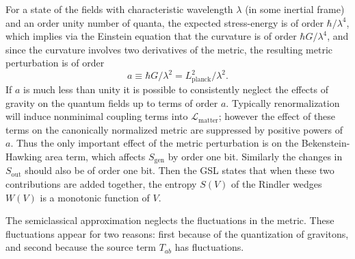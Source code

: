 \documentclass[12pt]{article}
\begin{document}
For a state of the fields with characteristic wavelength $\lambda$ (in some inertial frame) and an order unity number of quanta, the expected stress-energy is of order $\hbar / \lambda^4$, which implies via the Einstein equation that the curvature is of order $\hbar G / \lambda^4$, and since the curvature involves two derivatives of the metric, the resulting metric perturbation is of order
\begin{equation}
a \equiv \hbar G / \lambda^2 = L_\mathrm{planck}^2 / \lambda^2.
\end{equation}
If $a$ is much less than unity it is possible to consistently neglect the effects of gravity on the quantum fields up to terms of order $a$.  Typically renormalization will induce nonminimal coupling terms into $\mathcal{L}_\mathrm{matter}$; however the effect of these terms on the canonically normalized metric are suppressed by positive powers of $a$.  Thus the only important effect of the metric perturbation is on the Bekenstein-Hawking area term, which affects $S_\mathrm{gen}$ by order one bit.  Similarly the changes in $S_\mathrm{out}$ should also be of order one bit.  Then the GSL states that when these two contributions are added together, the entropy $S(V)$ of the Rindler wedges $W(V)$ is a monotonic function of $V$.

The semiclassical approximation neglects the fluctuations in the metric.  These fluctuations appear for two reasons: first because of the quantization of gravitons, and second because the source term $T_{ab}$ has fluctuations.
\end{document}
